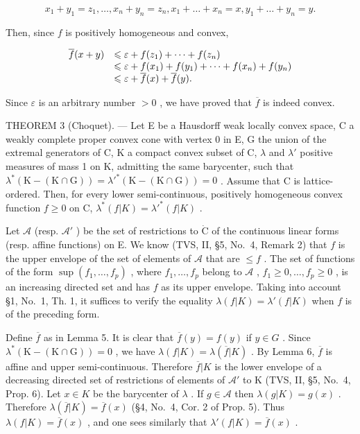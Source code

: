 \[
x _ {1} + y _ {1} = z _ {1}, \dots , x _ {n} + y _ {n} = z _ {n}, x _ {1} + \dots + x _ {n} = x, y _ {1} + \dots + y _ {n} = y.
\]

Then, since \(f\) is positively homogeneous and convex,

\[
\begin{array}{r l} \overline {{f}} (x + y) & \leqslant \varepsilon + f (z _ {1}) + \dots + f (z _ {n}) \\ & \leqslant \varepsilon + f (x _ {1}) + f (y _ {1}) + \dots + f (x _ {n}) + f (y _ {n}) \\ & \leqslant \varepsilon + \overline {{f}} (x) + \overline {{f}} (y). \end{array}
\]

Since \(\varepsilon\) is an arbitrary number \(>0\) , we have proved that \(\overline{f}\) is indeed convex.

THEOREM 3 (Choquet). --- Let E be a Hausdorff weak locally convex space, C a weakly complete proper convex cone with vertex 0 in E, G the union of the extremal generators of C, K a compact convex subset of C, \(\lambda\) and \(\lambda'\) positive measures of mass 1 on K, admitting the same barycenter, such that \(\lambda^{*}(\mathrm{K} - (\mathrm{K} \cap \mathrm{G})) = \lambda'^{*}(\mathrm{K} - (\mathrm{K} \cap \mathrm{G})) = 0\) . Assume that C is lattice-ordered. Then, for every lower semi-continuous, positively homogeneous convex function \(f \geqslant 0\) on C, \(\lambda^{*}(f|K) = \lambda'^{*}(f|K)\) .

Let \(\mathcal{A}\) (resp. \(\mathcal{A}'\) ) be the set of restrictions to \(\dot{\mathrm{C}}\) of the continuous linear forms (resp. affine functions) on E. We know (TVS, II, §5, No.~4, Remark 2) that \(f\) is the upper envelope of the set of elements of \(\mathcal{A}\) that are \(\leqslant f\) . The set of functions of the form \(\sup(f_1, \ldots, f_p)\) , where \(f_1, \ldots, f_p\) belong to \(\mathscr{A}\) , \(f_1 \geqslant 0, \ldots, f_p \geqslant 0\) , is an increasing directed set and has \(f\) as its upper envelope. Taking into account §1, No.~1, Th. 1, it suffices to verify the equality \(\lambda(f|K) = \lambda'(f|K)\) when \(f\) is of the preceding form.

Define \(\overline{f}\) as in Lemma 5. It is clear that \(\overline{f}(y) = f(y)\) if \(y \in G\) . Since \(\lambda^{*}(\mathrm{K} - (\mathrm{K} \cap \mathrm{G})) = 0\) , we have \(\lambda(f|K) = \lambda(\overline{f}|K)\) . By Lemma 6, \(\overline{f}\) is affine and upper semi-continuous. Therefore \(\overline{f}|K\) is the lower envelope of a decreasing directed set of restrictions of elements of \(\mathcal{A}'\) to K (TVS, II, §5, No.~4, Prop. 6). Let \(x \in K\) be the barycenter of \(\lambda\) . If \(g \in \mathcal{A}\) then \(\lambda(g|K) = g(x)\) . Therefore \(\lambda(\overline{f}|K) = \overline{f}(x)\) (§4, No.~4, Cor. 2 of Prop. 5). Thus \(\lambda(f|K) = \overline{f}(x)\) , and one sees similarly that \(\lambda'(f|K) = \overline{f}(x)\) .

